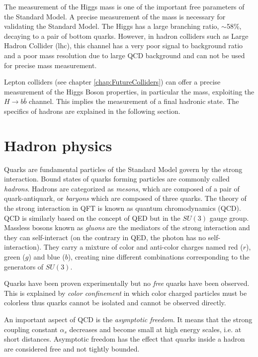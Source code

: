 The measurement of the Higgs mass is one of the important free parameters of the Standard Model. A precise measurement of the mass is necessary for validating the Standard Model. The Higgs has a large branching ratio, $\sim$58\%, decaying to a pair of bottom quarks. However, in hadron colliders such as Large Hadron Collider (\acrshort{lhc}), this channel has a very poor signal to background ratio and a poor mass resolution due to large QCD background and can not be used for precise mass measurement.

Lepton colliders (see chapter \ref{chap:FutureColliders}) can offer a precise measurement of the Higgs Boson properties, in particular the mass, exploiting the $H \rightarrow b\bar{b}$ channel. This implies the measurement of a final hadronic state. The specifics of hadrons are explained in the following section.

\section{Hadron physics}

Quarks are fundamental particles of the Standard Model govern by the strong interaction. Bound states of quarks forming particles are commonly called \textit{hadrons}. Hadrons are categorized as \textit{mesons}, which are composed of a pair of quark-antiquark, or \textit{baryons} which are composed of three quarks. The theory of the strong interaction in QFT is known as quantum chromodynamics (QCD). QCD is similarly based on the concept of QED but in the $SU(3)$ gauge group. Massless bosons known as \textit{gluons} are the mediators of the strong interaction and they can self-interact (on the contrary in QED, the photon has no self-interaction). They carry a mixture of color and anti-color charges named red ($r$), green ($g$) and blue ($b$), creating nine different combinations corresponding to the generators of $SU(3)$.

Quarks have been proven experimentally but no \textit{free} quarks have been observed. This is explained by \textit{color confinement} in which color charged particles must be colorless thus quarks cannot be isolated and cannot be observed directly.

An important aspect of QCD is the \textit{asymptotic freedom}. It means that the strong coupling constant $\alpha_s$ decreases and become small at high energy scales, i.e. at short distances. Asymptotic freedom has the effect that quarks inside a hadron are considered free and not tightly bounded.

